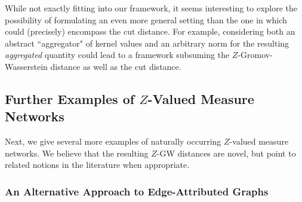 \documentclass[twoside,11pt]{article}
\theoremstyle{definition}
\begin{document}

While not exactly fitting into our framework, it seems interesting to explore the possibility of formulating an even more general setting than the one in  which could (precisely) encompass the cut distance. For example, considering both an abstract ``aggregator" of kernel values and  an arbitrary norm for the resulting \emph{aggregated} quantity could lead to a framework subsuming the $Z$-Gromov-Wasserstein distance as well as the cut distance.






\subsection{Further Examples of \texorpdfstring{$Z$}{Z}-Valued Measure Networks}\label{sec:other_examples}
Next, we give several more examples of naturally occurring $Z$-valued measure networks. We believe that the resulting $Z$-GW distances are novel, but point to related notions in the literature when appropriate.



\subsubsection{An Alternative Approach to Edge-Attributed Graphs}\label{sec:alternative_approach}
\end{document}
